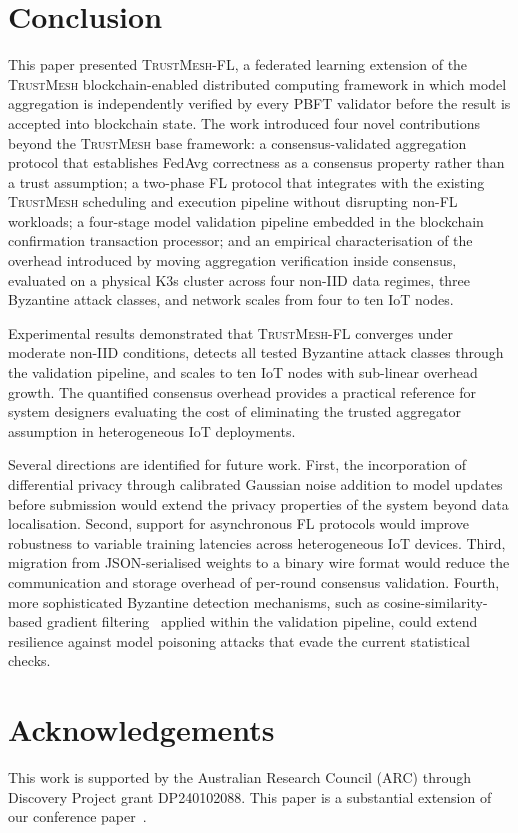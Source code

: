 \documentclass[lettersize,journal]{IEEEtran}
\newcommand{\tmfl}{\textsc{TrustMesh-FL}}
\newcommand{\tm}{\textsc{TrustMesh}}
\begin{document}
\section{Conclusion}
\label{sec:conclusion}

This paper presented \tmfl{}, a federated learning extension of the \tm{} blockchain-enabled
distributed computing framework in which model aggregation is independently verified by
every PBFT validator before the result is accepted into blockchain state. The work
introduced four novel contributions beyond the \tm{} base framework: a consensus-validated
aggregation protocol that establishes FedAvg correctness as a consensus property rather
than a trust assumption; a two-phase FL protocol that integrates with the existing \tm{}
scheduling and execution pipeline without disrupting non-FL workloads; a four-stage model
validation pipeline embedded in the blockchain confirmation transaction processor; and an
empirical characterisation of the overhead introduced by moving aggregation verification
inside consensus, evaluated on a physical K3s cluster across four non-IID data regimes,
three Byzantine attack classes, and network scales from four to ten IoT nodes.

Experimental results demonstrated that \tmfl{} converges under moderate non-IID conditions,
detects all tested Byzantine attack classes through the validation pipeline, and scales
to ten IoT nodes with sub-linear overhead growth. The quantified consensus overhead
provides a practical reference for system designers evaluating the cost of eliminating the
trusted aggregator assumption in heterogeneous IoT deployments.

Several directions are identified for future work. First, the incorporation of differential
privacy through calibrated Gaussian noise addition to model updates before submission would
extend the privacy properties of the system beyond data localisation. Second, support for
asynchronous FL protocols would improve robustness to variable training latencies across
heterogeneous IoT devices. Third, migration from JSON-serialised weights to a binary wire
format would reduce the communication and storage overhead of per-round consensus
validation. Fourth, more sophisticated Byzantine detection mechanisms, such as
cosine-similarity-based gradient filtering~\cite{fang2020local} applied within the
validation pipeline, could extend resilience against model poisoning attacks that evade
the current statistical checks.

\section*{Acknowledgements}
This work is supported by the Australian Research Council (ARC) through
Discovery Project grant DP240102088. This paper is a substantial extension of our conference paper~\cite{rangwala2025trustmesh}.



\end{document}
